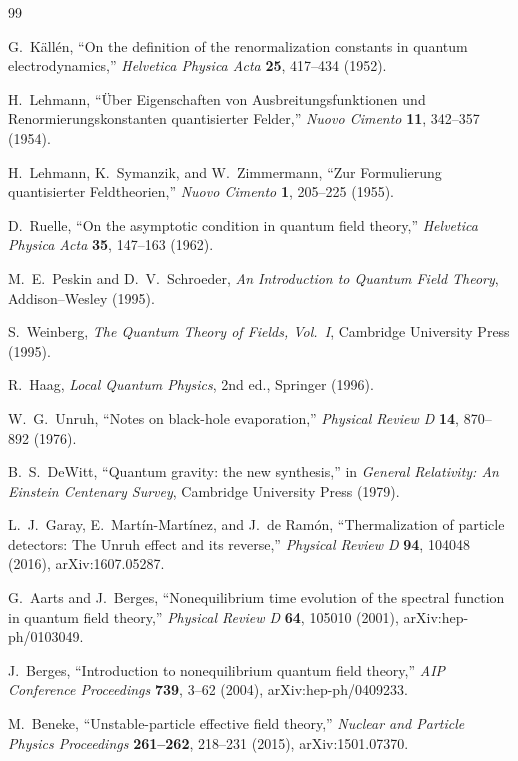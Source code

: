 \documentclass[11pt]{article}
\theoremstyle{remark}
\begin{document}
\begin{thebibliography}{99}

G.~K\"all\'en,
``On the definition of the renormalization constants in quantum electrodynamics,''
\textit{Helvetica Physica Acta} \textbf{25}, 417--434 (1952).

H.~Lehmann,
``\"Uber Eigenschaften von Ausbreitungsfunktionen und Renormierungskonstanten quantisierter Felder,''
\textit{Nuovo Cimento} \textbf{11}, 342--357 (1954).

H.~Lehmann, K.~Symanzik, and W.~Zimmermann,
``Zur Formulierung quantisierter Feldtheorien,''
\textit{Nuovo Cimento} \textbf{1}, 205--225 (1955).

D.~Ruelle,
``On the asymptotic condition in quantum field theory,''
\textit{Helvetica Physica Acta} \textbf{35}, 147--163 (1962).

M.~E.~Peskin and D.~V.~Schroeder,
\textit{An Introduction to Quantum Field Theory},
Addison--Wesley (1995).

S.~Weinberg,
\textit{The Quantum Theory of Fields, Vol.~I},
Cambridge University Press (1995).

R.~Haag,
\textit{Local Quantum Physics}, 2nd ed.,
Springer (1996).

W.~G.~Unruh,
``Notes on black-hole evaporation,''
\textit{Physical Review D} \textbf{14}, 870--892 (1976).

B.~S.~DeWitt,
``Quantum gravity: the new synthesis,''
in \textit{General Relativity: An Einstein Centenary Survey},
Cambridge University Press (1979).

L.~J.~Garay, E.~Mart\'in-Mart\'inez, and J.~de Ram\'on,
``Thermalization of particle detectors: The Unruh effect and its reverse,''
\textit{Physical Review D} \textbf{94}, 104048 (2016),
arXiv:1607.05287.

G.~Aarts and J.~Berges,
``Nonequilibrium time evolution of the spectral function in quantum field theory,''
\textit{Physical Review D} \textbf{64}, 105010 (2001),
arXiv:hep-ph/0103049.

J.~Berges,
``Introduction to nonequilibrium quantum field theory,''
\textit{AIP Conference Proceedings} \textbf{739}, 3--62 (2004),
arXiv:hep-ph/0409233.

M.~Beneke,
``Unstable-particle effective field theory,''
\textit{Nuclear and Particle Physics Proceedings} \textbf{261--262}, 218--231 (2015),
arXiv:1501.07370.


\end{thebibliography}
\end{document}
